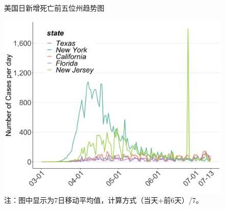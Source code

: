 \documentclass[]{article}
\begin{document}
\begin{minipage}{\textwidth}
  \begin{figure}[H]
  \centering
  \caption{美国日新增死亡前五位州趋势图}
  \includegraphics[]{./input/covid6.png}
  \captionsetup{font=large}\caption*{注：图中显示为7日移动平均值，计算方式（当天+前6天）/7。}
  \end{figure}
\end{minipage}
\end{document}
